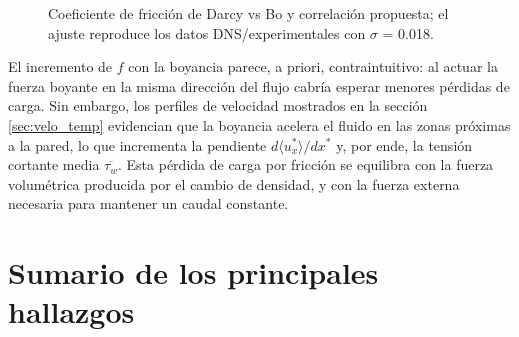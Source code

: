 \begin{figure}[H]
  \centering
  \caption{Coeficiente de fricción de Darcy vs Bo y correlación propuesta; el ajuste reproduce los datos DNS/experimentales con $\sigma$ = 0.018.}
  \label{fig:nusselt}
\end{figure}

El incremento de $f$ con la boyancia parece, a priori, contraintuitivo: al actuar la fuerza boyante en la misma dirección del flujo cabría esperar menores pérdidas de carga. Sin embargo, los perfiles de velocidad mostrados en la sección \ref{sec:velo_temp} evidencian que la boyancia acelera el fluido en las zonas próximas a la pared, lo que incrementa la pendiente $d \langle u^*_x \rangle / dx^*$ y, por ende, la tensión cortante media $\overline{\tau_w}$. Esta pérdida de carga por fricción se equilibra con la fuerza volumétrica producida por el cambio de densidad, y con la fuerza externa necesaria para mantener un caudal constante.



\section{Sumario de los principales hallazgos}

